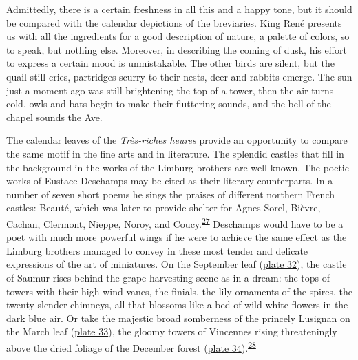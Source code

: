 \protect\hypertarget{21_Chapter_Thirteen__IMAGE_AND_WORD.xhtmlux5cux23page_352}{}{}Admittedly,
there is a certain freshness in all this and a happy tone, but it should
be compared with the calendar depictions of the breviaries. King René
presents us with all the ingredients for a good description of nature, a
palette of colors, so to speak, but nothing else. Moreover, in
describing the coming of dusk, his effort to express a certain mood is
unmistakable. The other birds are silent, but the quail still cries,
partridges scurry to their nests, deer and rabbits emerge. The sun just
a moment ago was still brightening the top of a tower, then the air
turns cold, owls and bats begin to make their fluttering sounds, and the
bell of the chapel sounds the Ave.

The calendar leaves of the \emph{Très-riches heures} provide an
opportunity to compare the same motif in the fine arts and in
literature. The splendid castles that fill in the background in the
works of the Limburg brothers are well known. The poetic works of
Eustace Deschamps may be cited as their literary counterparts. In a
number of seven short poems he sings the praises of different northern
French castles: Beauté, which was later to provide shelter for Agnes
Sorel, Bièvre, Cachan, Clermont, Nieppe, Noroy, and
Coucy.\textsuperscript{\protect\hypertarget{21_Chapter_Thirteen__IMAGE_AND_WORD.xhtmlux5cux23id_256}{\protect\hyperlink{23_NOTES.xhtmlux5cux23id_257}{27}}}
Deschamps would have to be a poet with much more powerful wings if he
were to achieve the same effect as the Limburg brothers managed to
convey in these most tender and delicate expressions of the art of
miniatures. On the September leaf
(\protect\hyperlink{20_ILLUSTRATIONS_FOLLOW_PAGE.xhtmlux5cux23id_29}{plate
32}), the castle of Saumur rises behind the grape harvesting scene as in
a dream: the tops of towers with their high wind vanes, the finials, the
lily ornaments of the spires, the twenty slender chimneys, all that
blossoms like a bed of wild white flowers in the dark blue air. Or take
the majestic broad somberness of the princely Lusignan on the March leaf
(\protect\hyperlink{20_ILLUSTRATIONS_FOLLOW_PAGE.xhtmlux5cux23id_2301}{plate
33}), the gloomy towers of Vincennes rising threateningly above the
dried foliage of the December forest
(\protect\hyperlink{20_ILLUSTRATIONS_FOLLOW_PAGE.xhtmlux5cux23id_30}{plate
34}).\textsuperscript{\protect\hypertarget{21_Chapter_Thirteen__IMAGE_AND_WORD.xhtmlux5cux23id_254}{\protect\hyperlink{23_NOTES.xhtmlux5cux23id_255}{28}}}

